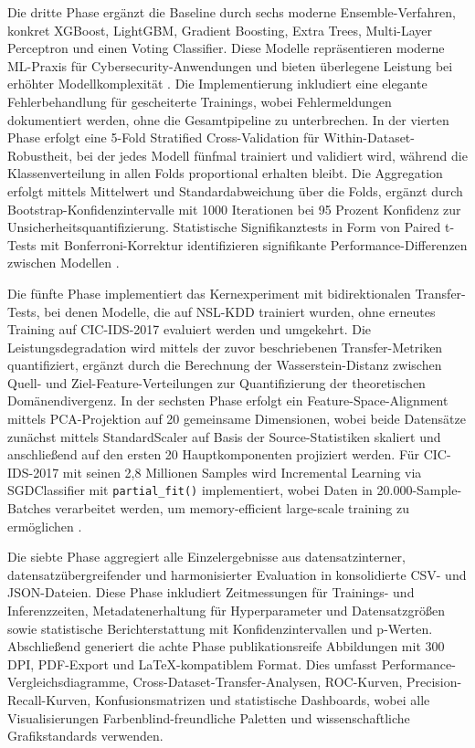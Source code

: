 \documentclass[11pt,a4paper]{article}
\begin{document}
    Die dritte Phase ergänzt die Baseline durch sechs moderne Ensemble-Verfahren, konkret XGBoost, LightGBM, Gradient Boosting, Extra Trees, Multi-Layer Perceptron und einen Voting Classifier. Diese Modelle repräsentieren moderne ML-Praxis für Cybersecurity-Anwendungen und bieten überlegene Leistung bei erhöhter Modellkomplexität \parencite{Vinayakumar2019}. Die Implementierung inkludiert eine elegante Fehlerbehandlung für gescheiterte Trainings, wobei Fehlermeldungen dokumentiert werden, ohne die Gesamtpipeline zu unterbrechen. In der vierten Phase erfolgt eine 5-Fold Stratified Cross-Validation für Within-Dataset-Robustheit, bei der jedes Modell fünfmal trainiert und validiert wird, während die Klassenverteilung in allen Folds proportional erhalten bleibt. Die Aggregation erfolgt mittels Mittelwert und Standardabweichung über die Folds, ergänzt durch Bootstrap-Konfidenzintervalle mit 1000 Iterationen bei 95 Prozent Konfidenz zur Unsicherheitsquantifizierung. Statistische Signifikanztests in Form von Paired t-Tests mit Bonferroni-Korrektur identifizieren signifikante Performance-Differenzen zwischen Modellen \parencite{Hastie2009}.

    Die fünfte Phase implementiert das Kernexperiment mit bidirektionalen Transfer-Tests, bei denen Modelle, die auf NSL-KDD trainiert wurden, ohne erneutes Training auf CIC-IDS-2017 evaluiert werden und umgekehrt. Die Leistungsdegradation wird mittels der zuvor beschriebenen Transfer-Metriken quantifiziert, ergänzt durch die Berechnung der Wasserstein-Distanz zwischen Quell- und Ziel-Feature-Verteilungen zur Quantifizierung der theoretischen Domänendivergenz. In der sechsten Phase erfolgt ein Feature-Space-Alignment mittels PCA-Projektion auf 20 gemeinsame Dimensionen, wobei beide Datensätze zunächst mittels StandardScaler auf Basis der Source-Statistiken skaliert und anschließend auf den ersten 20 Hauptkomponenten projiziert werden. Für CIC-IDS-2017 mit seinen 2,8 Millionen Samples wird Incremental Learning via SGDClassifier mit \texttt{partial\_fit()} implementiert, wobei Daten in 20.000-Sample-Batches verarbeitet werden, um memory-efficient large-scale training zu ermöglichen \parencite{Bishop2006}.

    Die siebte Phase aggregiert alle Einzelergebnisse aus datensatzinterner, datensatzübergreifender und harmonisierter Evaluation in konsolidierte CSV- und JSON-Dateien. Diese Phase inkludiert Zeitmessungen für Trainings- und Inferenzzeiten, Metadatenerhaltung für Hyperparameter und Datensatzgrößen sowie statistische Berichterstattung mit Konfidenzintervallen und p-Werten. Abschließend generiert die achte Phase publikationsreife Abbildungen mit 300 DPI, PDF-Export und LaTeX-kompatiblem Format. Dies umfasst Performance-Vergleichsdiagramme, Cross-Dataset-Transfer-Analysen, ROC-Kurven, Precision-Recall-Kurven, Konfusionsmatrizen und statistische Dashboards, wobei alle Visualisierungen Farbenblind-freundliche Paletten und wissenschaftliche Grafikstandards verwenden.
\end{document}
